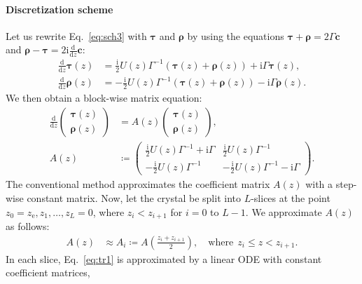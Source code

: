 \documentclass[preprint, 5p, times, sort&compress]{elsarticle}
\def\vecc{\bm{c}}
\def\vtau{\bm{\tau}}
\def\vrho{\bm{\rho}}
\def\zbot{z_\text{e}}
\def\dd{\mathrm{d}}
\def\imag{\mathrm{i}}
\begin{document}
        \paragraph{Discretization scheme}
        Let us rewrite Eq.~\eqref{eq:sch3} with $\vtau$ and $\vrho$
        by using the equations $\vtau+\vrho=2\Gamma\vecc$ and $\vrho-\vtau=2\mathrm{i}\frac{\dd}{\dd z}\vecc$:
        \begin{align}
                \frac{\dd}{\dd z}\vtau(z) &= \frac{\imag}{2}U(z)\Gamma^{-1}(\vtau(z)+\vrho(z)) + \mathrm{i}\Gamma\vtau(z), \\
                \frac{\dd}{\dd z}\vrho(z) &= -\frac{\imag}{2}U(z)\Gamma^{-1}(\vtau(z)+\vrho(z)) - \mathrm{i}\Gamma\vrho(z).
        \end{align}
        We then obtain a block-wise matrix equation:
        \begin{align}
                \frac{\dd}{\dd z}
                \begin{pmatrix}
                        \vtau(z)\\
                        \vrho(z)
                \end{pmatrix}
                &=
                A(z)
                \begin{pmatrix}
                        \vtau(z)\\
                        \vrho(z)
                \end{pmatrix},
                \label{eq:tr1}\\
                A(z) &\coloneqq
                \begin{pmatrix}
                        \frac{\imag}{2}U(z)\Gamma^{-1}+\imag\Gamma & \frac{\imag}{2}U(z)\Gamma^{-1} \\
                        -\frac{\imag}{2}U(z)\Gamma^{-1} & -\frac{\imag}{2}U(z)\Gamma^{-1} -\imag\Gamma
                \end{pmatrix}.
        \end{align}
        The conventional method approximates the coefficient matrix $A(z)$ with a step-wise constant matrix.
        Now, let the crystal be split into $L$-slices at the point $z_0=\zbot, z_1, \ldots, z_L=0$, where $z_i<z_{i+1}$ for $i=0$ to $L-1$.
        We approximate $A(z)$ as follows:
        \begin{align}
                A(z) &\approx A_i \coloneqq A\left(\frac{z_i+z_{i+1}}{2}\right), \quad \text{where} \ \ z_i \le z < z_{i+1}. \label{eq:ds0}
        \end{align}
        In each slice, Eq.~\eqref{eq:tr1} is approximated by a linear ODE with constant coefficient matrices,
\end{document}
